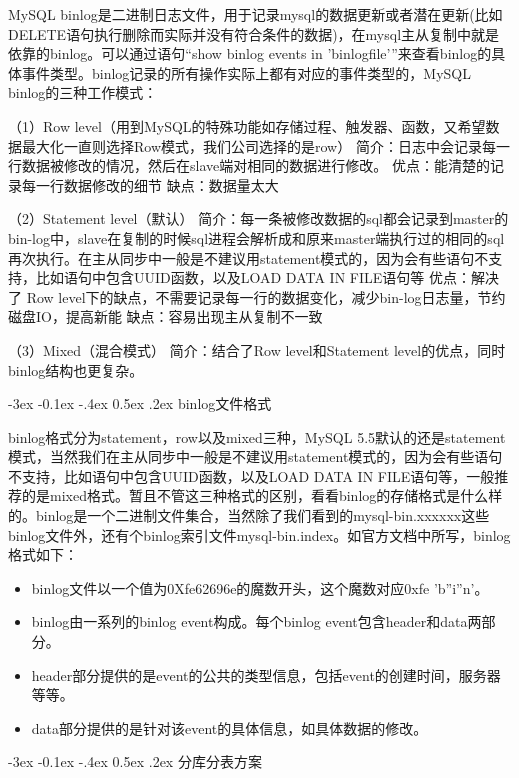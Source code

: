\documentclass[8pt]{book}
\makeatletter
\numberwithin{dummy}{section}
\theoremstyle{ocrenumbox}
\theoremstyle{blacknumex}
\theoremstyle{blacknumbox}
\theoremstyle{ocrenum}
\renewcommand{\subsection}{\@startsection {subsection}{2}{\z@}
	{-3ex \@plus -0.1ex \@minus -.4ex}
	{0.5ex \@plus.2ex }
	{\normalfont\sffamily\bfseries}}
\makeatother
\begin{document}
MySQL binlog是二进制日志文件，用于记录mysql的数据更新或者潜在更新(比如DELETE语句执行删除而实际并没有符合条件的数据)，在mysql主从复制中就是依靠的binlog。可以通过语句“show binlog events in 'binlogfile'”来查看binlog的具体事件类型。binlog记录的所有操作实际上都有对应的事件类型的，MySQL binlog的三种工作模式：

（1）Row level（用到MySQL的特殊功能如存储过程、触发器、函数，又希望数据最大化一直则选择Row模式，我们公司选择的是row）
简介：日志中会记录每一行数据被修改的情况，然后在slave端对相同的数据进行修改。
优点：能清楚的记录每一行数据修改的细节
缺点：数据量太大

（2）Statement level（默认）
简介：每一条被修改数据的sql都会记录到master的bin-log中，slave在复制的时候sql进程会解析成和原来master端执行过的相同的sql再次执行。在主从同步中一般是不建议用statement模式的，因为会有些语句不支持，比如语句中包含UUID函数，以及LOAD DATA IN FILE语句等
优点：解决了 Row level下的缺点，不需要记录每一行的数据变化，减少bin-log日志量，节约磁盘IO，提高新能
缺点：容易出现主从复制不一致

（3）Mixed（混合模式）
简介：结合了Row level和Statement level的优点，同时binlog结构也更复杂。

\subsection{binlog文件格式}

binlog格式分为statement，row以及mixed三种，MySQL 5.5默认的还是statement模式，当然我们在主从同步中一般是不建议用statement模式的，因为会有些语句不支持，比如语句中包含UUID函数，以及LOAD DATA IN FILE语句等，一般推荐的是mixed格式。暂且不管这三种格式的区别，看看binlog的存储格式是什么样的。binlog是一个二进制文件集合，当然除了我们看到的mysql-bin.xxxxxx这些binlog文件外，还有个binlog索引文件mysql-bin.index。如官方文档中所写，binlog格式如下：

\begin{itemize}
\item{binlog文件以一个值为0Xfe62696e的魔数开头，这个魔数对应0xfe 'b''i''n'。}
\item{binlog由一系列的binlog event构成。每个binlog event包含header和data两部分。}
\item{header部分提供的是event的公共的类型信息，包括event的创建时间，服务器等等。}
\item{data部分提供的是针对该event的具体信息，如具体数据的修改。}
\end{itemize}


\subsection{分库分表方案}
\end{document}
